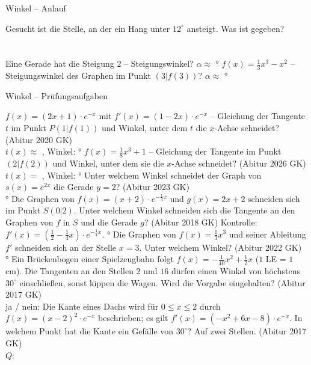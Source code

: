 \begin{aufgabe}{Winkel – Anlauf}
\begin{teile}
\teil Gesucht ist die Stelle, an der ein Hang unter $12^\circ$ ansteigt. Was ist gegeben? \\  \\  \\ 
\teil Eine Gerade hat die Steigung $2$ – Steigungswinkel? $\alpha \approx$ \leerfeld °
\teil $f(x) = \frac{1}{3}x^3 - x^2$ – Steigungswinkel des Graphen im Punkt $(3 | f(3))$? $\alpha \approx$ \leerfeld °
\end{teile}
\end{aufgabe}

\begin{aufgabe}{Winkel – Prüfungsaufgaben}
\begin{teile}
\teil $f(x) = (2x + 1) \cdot e^{-x}$ mit $f'(x) = (1 - 2x) \cdot e^{-x}$ – Gleichung der Tangente $t$ im Punkt $P(1 | f(1))$ und Winkel, unter dem $t$ die $x$-Achse schneidet? \hfill (Abitur 2020 GK) \\ $t(x) \approx$ \leerfeld , Winkel: \leerfeld °
\teil $f(x) = \frac{1}{8}x^3 + 1$ – Gleichung der Tangente im Punkt $(2 | f(2))$ und Winkel, unter dem sie die $x$-Achse schneidet? \hfill (Abitur 2026 GK) \\ $t(x) =$ \leerfeld , Winkel: \leerfeld °
\teil Unter welchem Winkel schneidet der Graph von $s(x) = e^{2x}$ die Gerade $y = 2$? \hfill (Abitur 2023 GK) \\ \leerfeld °
\teil Die Graphen von $f(x) = (x + 2) \cdot e^{-\frac{1}{4}x}$ und $g(x) = 2x + 2$ schneiden sich im Punkt $S(0 | 2)$. Unter welchem Winkel schneiden sich die Tangente an den Graphen von $f$ in $S$ und die Gerade $g$? \hfill (Abitur 2018 GK) Kontrolle: $f'(x) = (\frac{1}{2} - \frac{1}{4}x) \cdot e^{-\frac{1}{4}x}$. \leerfeld °
\teil Die Graphen von $f(x) = \frac{1}{3}x^3$ und seiner Ableitung $f'$ schneiden sich an der Stelle $x = 3$. Unter welchem Winkel? \hfill (Abitur 2022 GK) \\ \leerfeld °
\teil Ein Brückenbogen einer Spielzeugbahn folgt $f(x) = -\frac{1}{40}x^2 + \frac{1}{2}x$ ($1$ LE = $1$ cm). Die Tangenten an den Stellen $2$ und $16$ dürfen einen Winkel von höchstens $30^\circ$ einschließen, sonst kippen die Wagen. Wird die Vorgabe eingehalten? \hfill (Abitur 2017 GK) \\ ja / nein: \leerfeld
\teil Die Kante eines Dachs wird für $0 \le x \le 2$ durch $f(x) = (x - 2)^2 \cdot e^{-x}$ beschrieben; es gilt $f'(x) = (-x^2 + 6x - 8) \cdot e^{-x}$. In welchem Punkt hat die Kante ein Gefälle von $30^\circ$? Auf zwei Stellen. \hfill (Abitur 2017 GK) \\ $Q$: \leerfeld

\end{teile}
\end{aufgabe}

